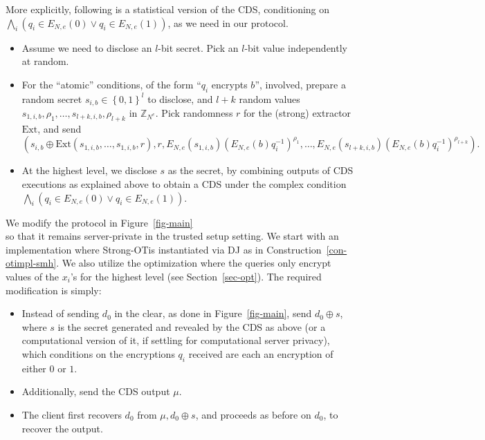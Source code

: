 \documentclass{article}
\newcommand{\set}[1]{\left\{#1\right\}}
\newcommand{\Z}{{\mathbb{Z}}}
\newcommand{\strongot}{{Strong-OT\;}}
\begin{document}
More explicitly, following is a statistical version of the CDS, conditioning on $\bigwedge_i(q_i\in E_{N,e}(0)\vee q_i\in E_{N,e}(1))$,
as we need in our protocol.
\begin{itemize}
\item Assume we need to disclose an $l$-bit secret. Pick an $l$-bit value independently at random.
\item For the ``atomic'' conditions, of the form ``$q_i$ encrypts $b$'', involved, prepare a random secret
$s_{i,b}\in\set{0,1}^l$ to disclose, and $l+k$ random values $s_{1,i,b},\rho_1,\ldots,s_{l+k,i,b},\rho_{l+k}$ in $\Z_{N^e}$. Pick
randomness $r$ for the (strong) extractor $\text{Ext}$, and send \[(s_{i,b}\oplus \text{Ext}(s_{1,i,b},\ldots,s_{1,i,b},r),r,E_{N,e}(s_{1,i,b})(E_{N,e}(b)q^{-1}_i)^{\rho_1},\ldots,E_{N,e}(s_{l+k,i,b})(E_{N,e}(b)q^{-1}_i)^{\rho_{l+k}}).\]
\item At the highest level, we disclose $s$ as the secret, by combining outputs of CDS executions as explained above
to obtain a CDS under the complex condition $\bigwedge_i(q_i\in E_{N,e}(0)\vee q_i\in E_{N,e}(1))$.
\end{itemize}
We modify the protocol in Figure~\ref{fig-main}\\ 
so that it remains server-private in the trusted setup setting. We start with an implementation
where \strongot is instantiated via DJ as in Construction~\ref{con-otimpl-smh}. We also utilize the optimization where the queries only encrypt values of the $x_i$'s for the highest level (see
Section~\ref{sec-opt}). The required modification is simply:
\begin{itemize}
\item Instead of sending $d_0$ in the clear, as done in Figure~\ref{fig-main}, send $d_0\oplus s$, where $s$ is the secret generated and revealed by the CDS as
above (or a computational version of it, if settling for computational server privacy), which conditions on the encryptions $q_i$ received are each an encryption of either $0$ or $1$.
\item Additionally, send the CDS output $\mu$.
\item The client first recovers $d_0$ from $\mu,d_0\oplus s$, and proceeds as before on $d_0$, to recover the output.
\end{itemize}
\end{document}
